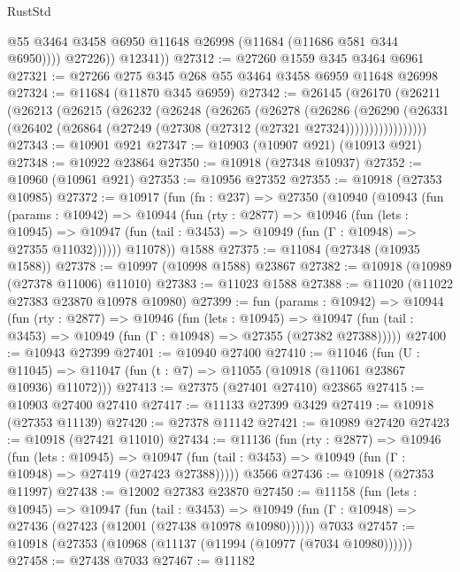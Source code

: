 \begin{lexlean}{RustStd}
\begin{coremodule}
{{{{{{{{{{{{{{{{{{{                @55
                @3464
                @3458
                @6950
                @11648
                @26998
                (@11684 (@11686 @581 @344 @6950))))
            @27226))
        @12341))
@27312 := @27260 @1559 @345 @3464 @6961
@27321 := @27266 @275 @345 @268 @55 @3464 @3458 @6959 @11648 @26998
@27324 := @11684 (@11870 @345 @6959)
@27342 := @26145
    (@26170
      (@26211
        (@26213
          (@26215
            (@26232
              (@26248
                (@26265
                  (@26278
                    (@26286
                      (@26290
                        (@26331
                          (@26402 (@26864 (@27249 (@27308 (@27312 (@27321 @27324)))))))))))))))))
@27343 := @10901 @921
@27347 := @10903 (@10907 @921) (@10913 @921)
@27348 := @10922 @23864
@27350 := @10918 (@27348 @10937)
@27352 := @10960 (@10961 @921)
@27353 := @10956 @27352
@27355 := @10918 (@27353 @10985)
@27372 := @10917
    (fun (fn : @237) =>
    @27350
      (@10940
        (@10943
          (fun (params : @10942) =>
          @10944
            (fun (rty : @2877) =>
            @10946
              (fun (lets : @10945) =>
              @10947 (fun (tail : @3453) => @10949 (fun (Γ : @10948) => @27355 @11032))))))
        @11078))
    @1588
@27375 := @11084 (@27348 (@10935 @1588))
@27378 := @10997 (@10998 @1588) @23867
@27382 := @10918 (@10989 (@27378 @11006) @11010)
@27383 := @11023 @1588
@27388 := @11020 (@11022 @27383 @23870 @10978 @10980)
@27399 := fun (params : @10942) =>
  @10944
    (fun (rty : @2877) =>
    @10946
      (fun (lets : @10945) =>
      @10947 (fun (tail : @3453) => @10949 (fun (Γ : @10948) => @27355 (@27382 @27388)))))
@27400 := @10943 @27399
@27401 := @10940 @27400
@27410 := @11046
    (fun (U : @11045) => @11047 (fun (t : @7) => @11055 (@10918 (@11061 @23867 @10936) @11072)))
@27413 := @27375 (@27401 @27410) @23865
@27415 := @10903 @27400 @27410
@27417 := @11133 @27399 @3429
@27419 := @10918 (@27353 @11139)
@27420 := @27378 @11142
@27421 := @10989 @27420
@27423 := @10918 (@27421 @11010)
@27434 := @11136
    (fun (rty : @2877) =>
    @10946
      (fun (lets : @10945) =>
      @10947 (fun (tail : @3453) => @10949 (fun (Γ : @10948) => @27419 (@27423 @27388)))))
    @3566
@27436 := @10918 (@27353 @11997)
@27438 := @12002 @27383 @23870
@27450 := @11158
    (fun (lets : @10945) =>
    @10947
      (fun (tail : @3453) =>
      @10949 (fun (Γ : @10948) => @27436 (@27423 (@12001 (@27438 @10978 @10980))))))
    @7033
@27457 := @10918 (@27353 (@10968 (@11137 (@11994 (@10977 (@7034 @10980))))))
@27458 := @27438 @7033
@27467 := @11182
}}}}}}}}}}}}}}}}}}}
\end{coremodule}
\end{lexlean}
